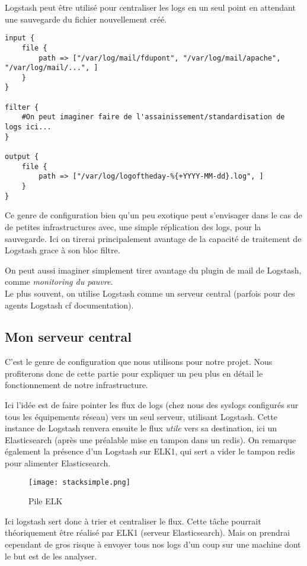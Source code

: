 Logstash peut être utilisé pour centraliser les logs en un seul point en attendant
une sauvegarde du fichier nouvellement créé.


\begin{lstlisting}[style=logstash,label={lst:conflogstashminimale2},caption={Un autre exemple de configuration minime}]
input {
    file {
        path => ["/var/log/mail/fdupont", "/var/log/mail/apache", "/var/log/mail/...", ]
    }
}

filter {
    #On peut imaginer faire de l'assainissement/standardisation de logs ici...
}

output {
    file {
        path => ["/var/log/logoftheday-%{+YYYY-MM-dd}.log", ]
    }
}
\end{lstlisting}
Ce genre de configuration bien qu'un peu exotique peut s'envisager dans le cas de
de petites infrastructures avec, une simple réplication des logs, pour la sauvegarde.
Ici on tirerai principalement avantage de la capacité de traitement de Logstash grace
à son bloc filtre.

On peut aussi imaginer simplement tirer avantage du plugin de mail de Logstash, 
comme \textit{monitoring du pauvre}.\\[4mm]

Le plus souvent, on utilise Logstash comme un serveur central (parfois pour 
des agents Logstash cf documentation).

\subsection{Mon serveur central}
C'est le genre de configuration que nous utilisons pour notre projet. Nous profiterons
donc de cette partie pour expliquer un peu plus en détail le fonctionnement de notre
infrastructure.

Ici l'idée est de faire pointer les flux de \gls{logs} (chez nous des syslogs configurés 
sur tous les équipements réseau) vers un seul serveur, utilisant Logstash. Cette 
instance de Logstash renvera ensuite le flux \textit{utile} vers sa destination, 
ici un Elasticsearch (après une préalable mise en tampon dans un redis).
On remarque également la présence d'un Logstash sur ELK1, qui sert a vider le tampon
redis pour alimenter Elasticsearch.
\begin{figure}[H]
\center
\texttt{[image: stacksimple.png]}
\label{fig:elkstack1}
\caption{Pile ELK}
\end{figure}

Ici logstash sert donc à trier et centraliser le flux. Cette tâche pourrait théoriquement 
être réalisé par ELK1 (serveur Elasticsearch).
Mais on prendrai cependant de gros risque à envoyer tous nos logs d'un coup sur une machine
dont le but est de les analyser.

